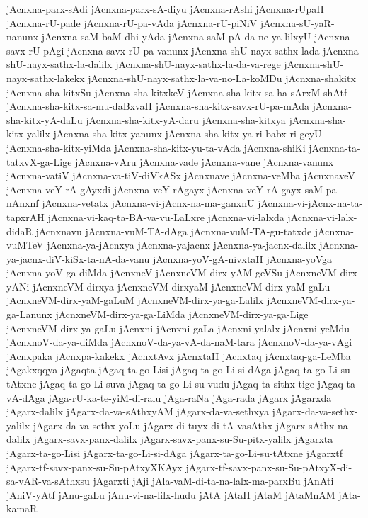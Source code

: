 {jAcnxna-parx-sAdi
jAcnxna-parx-sA-diyu
jAcnxna-rAshi
jAcnxna-rUpaH
jAcnxna-rU-pade
jAcnxna-rU-pa-vAda
jAcnxna-rU-piNiV
jAcnxna-sU-yaR-nanunx
jAcnxna-saM-baM-dhi-yAda
jAcnxna-saM-pA-da-ne-ya-lilxyU
jAcnxna-savx-rU-pAgi
jAcnxna-savx-rU-pa-vanunx
jAcnxna-shU-nayx-sathx-lada
jAcnxna-shU-nayx-sathx-la-dalilx
jAcnxna-shU-nayx-sathx-la-da-va-rege
jAcnxna-shU-nayx-sathx-lakekx
jAcnxna-shU-nayx-sathx-la-va-no-La-koMDu
jAcnxna-shakitx
jAcnxna-sha-kitxSu
jAcnxna-sha-kitxkeV
jAcnxna-sha-kitx-sa-ha-sArxM-shAtf
jAcnxna-sha-kitx-sa-mu-daBxvaH
jAcnxna-sha-kitx-savx-rU-pa-mAda
jAcnxna-sha-kitx-yA-daLu
jAcnxna-sha-kitx-yA-daru
jAcnxna-sha-kitxya
jAcnxna-sha-kitx-yalilx
jAcnxna-sha-kitx-yanunx
jAcnxna-sha-kitx-ya-ri-babx-ri-geyU
jAcnxna-sha-kitx-yiMda
jAcnxna-sha-kitx-yu-ta-vAda
jAcnxna-shiKi
jAcnxna-ta-tatxvX-ga-Lige
jAcnxna-vAru
jAcnxna-vade
jAcnxna-vane
jAcnxna-vanunx
jAcnxna-vatiV
jAcnxna-va-tiV-diVkASx
jAcnxnave
jAcnxna-veMba
jAcnxnaveV
jAcnxna-veY-rA-gAyxdi
jAcnxna-veY-rAgayx
jAcnxna-veY-rA-gayx-saM-pa-nAnxnf
jAcnxna-vetatx
jAcnxna-vi-jAcnx-na-ma-ganxnU
jAcnxna-vi-jAcnx-na-ta-tapxrAH
jAcnxna-vi-kaq-ta-BA-va-vu-LaLxre
jAcnxna-vi-lalxda
jAcnxna-vi-lalx-didaR
jAcnxnavu
jAcnxna-vuM-TA-dAga
jAcnxna-vuM-TA-gu-tatxde
jAcnxna-vuMTeV
jAcnxna-ya-jAcnxya
jAcnxna-yajacnx
jAcnxna-ya-jacnx-dalilx
jAcnxna-ya-jacnx-diV-kiSx-ta-nA-da-vanu
jAcnxna-yoV-gA-nivxtaH
jAcnxna-yoVga
jAcnxna-yoV-ga-diMda
jAcnxneV
jAcnxneVM-dirx-yAM-geVSu
jAcnxneVM-dirx-yANi
jAcnxneVM-dirxya
jAcnxneVM-dirxyaM
jAcnxneVM-dirx-yaM-gaLu
jAcnxneVM-dirx-yaM-gaLuM
jAcnxneVM-dirx-ya-ga-Lalilx
jAcnxneVM-dirx-ya-ga-Lanunx
jAcnxneVM-dirx-ya-ga-LiMda
jAcnxneVM-dirx-ya-ga-Lige
jAcnxneVM-dirx-ya-gaLu
jAcnxni
jAcnxni-gaLa
jAcnxni-yalalx
jAcnxni-yeMdu
jAcnxnoV-da-ya-diMda
jAcnxnoV-da-ya-vA-da-naM-tara
jAcnxnoV-da-ya-vAgi
jAcnxpaka
jAcnxpa-kakekx
jAcnxtAvx
jAcnxtaH
jAcnxtaq
jAcnxtaq-ga-LeMba
jAgakxqqya
jAgaqta
jAgaq-ta-go-Lisi
jAgaq-ta-go-Li-si-dAga
jAgaq-ta-go-Li-su-tAtxne
jAgaq-ta-go-Li-suva
jAgaq-ta-go-Li-su-vudu
jAgaq-ta-sithx-tige
jAgaq-ta-vA-dAga
jAga-rU-ka-te-yiM-di-ralu
jAga-raNa
jAga-rada
jAgarx
jAgarxda
jAgarx-dalilx
jAgarx-da-va-sAthxyAM
jAgarx-da-va-sethxya
jAgarx-da-va-sethx-yalilx
jAgarx-da-va-sethx-yoLu
jAgarx-di-tuyx-di-tA-vasAthx
jAgarx-sAthx-na-dalilx
jAgarx-savx-panx-dalilx
jAgarx-savx-panx-su-Su-pitx-yalilx
jAgarxta
jAgarx-ta-go-Lisi
jAgarx-ta-go-Li-si-dAga
jAgarx-ta-go-Li-su-tAtxne
jAgarxtf
jAgarx-tf-savx-panx-su-Su-pAtxyXKAyx
jAgarx-tf-savx-panx-su-Su-pAtxyX-di-sa-vAR-va-sAthxsu
jAgarxti
jAji
jAla-vaM-di-ta-na-lalx-ma-parxBu
jAnAti
jAniV-yAtf
jAnu-gaLu
jAnu-vi-na-lilx-hudu
jAtA
jAtaH
jAtaM
jAtaMnAM
jAta-kamaR
}

